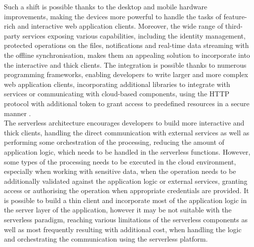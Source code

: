 Such a shift is possible thanks to the desktop and mobile hardware improvements, making the devices more powerful to handle the tasks of feature-rich and interactive web application clients.
Moreover, the wide range of third-party services exposing various capabilities, including the identity management, protected operations on the files, notifications and real-time data streaming with the offline synchronisation, makes them an appealing solution to incorporate into the interactive and thick clients.
The integration is possible thanks to numerous programming frameworks, enabling developers to write larger and more complex web application clients, incorporating additional libraries to integrate with services or communicating with cloud-based components, using the HTTP protocol with additional token to grant access to predefined resources in a secure manner \cite{ServerlessTheFutureOfSoftwareArchitecture}. \\

The serverless architecture encourages developers to build more interactive and thick clients, handling the direct communication with external services as well as performing some orchestration of the processing, reducing the amount of application logic, which needs to be handled in the serverless functions.
However, some types of the processing needs to be executed in the cloud environment, especially when working with sensitive data, when the operation needs to be additionally validated against the application logic or external services, granting access or authorising the operation when appropriate credentials are provided.
It is possible to build a thin client and incorporate most of the application logic in the server layer of the application, however it may be not suitable with the serverless paradigm, reaching various limitations of the serverless components as well as most frequently resulting with additional cost, when handling the logic and orchestrating the communication using the serverless platform. \\


